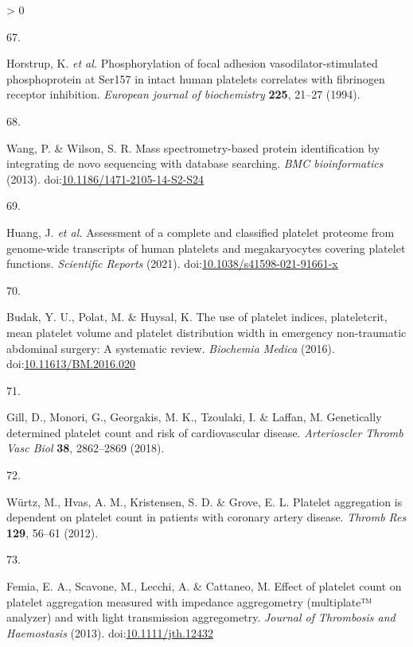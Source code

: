 \documentclass[11pt,twoside]{bristolthesis}
\newlength{\cslhangindent}
\newlength{\csllabelwidth}
\newenvironment{CSLReferences}[2] %
 {%
  \setlength{\parindent}{0pt}
  \ifodd #1 \everypar{\setlength{\hangindent}{\cslhangindent}}\ignorespaces\fi
  \ifnum #2 > 0
  \setlength{\parskip}{#2\baselineskip}
  \fi
 }%
 {}
\newcommand{\CSLLeftMargin}[1]{\parbox[t]{\csllabelwidth}{#1}}
\newcommand{\CSLRightInline}[1]{\parbox[t]{\linewidth - \csllabelwidth}{#1}\break}
\begin{document}
\begin{CSLReferences}{0}{0}
\leavevmode\hypertarget{ref-Horstrup1994}{}%
\CSLLeftMargin{67. }
\CSLRightInline{Horstrup, K. \emph{et al.} Phosphorylation of focal adhesion vasodilator-stimulated phosphoprotein at Ser157 in intact human platelets correlates with fibrinogen receptor inhibition. \emph{European journal of biochemistry} \textbf{225}, 21--27 (1994).}

\leavevmode\hypertarget{ref-Wang2013}{}%
\CSLLeftMargin{68. }
\CSLRightInline{Wang, P. \& Wilson, S. R. Mass spectrometry-based protein identification by integrating de novo sequencing with database searching. \emph{BMC bioinformatics} (2013). doi:\href{https://doi.org/10.1186/1471-2105-14-S2-S24}{10.1186/1471-2105-14-S2-S24}}

\leavevmode\hypertarget{ref-Huang2021}{}%
\CSLLeftMargin{69. }
\CSLRightInline{Huang, J. \emph{et al.} Assessment of a complete and classified platelet proteome from genome-wide transcripts of human platelets and megakaryocytes covering platelet functions. \emph{Scientific Reports} (2021). doi:\href{https://doi.org/10.1038/s41598-021-91661-x}{10.1038/s41598-021-91661-x}}

\leavevmode\hypertarget{ref-Budak2016}{}%
\CSLLeftMargin{70. }
\CSLRightInline{Budak, Y. U., Polat, M. \& Huysal, K. The use of platelet indices, plateletcrit, mean platelet volume and platelet distribution width in emergency non-traumatic abdominal surgery: A systematic review. \emph{Biochemia Medica} (2016). doi:\href{https://doi.org/10.11613/BM.2016.020}{10.11613/BM.2016.020}}

\leavevmode\hypertarget{ref-Gill2018}{}%
\CSLLeftMargin{71. }
\CSLRightInline{Gill, D., Monori, G., Georgakis, M. K., Tzoulaki, I. \& Laffan, M. Genetically determined platelet count and risk of cardiovascular disease. \emph{Arterioscler Thromb Vasc Biol} \textbf{38}, 2862--2869 (2018).}

\leavevmode\hypertarget{ref-Wurtz2012}{}%
\CSLLeftMargin{72. }
\CSLRightInline{Würtz, M., Hvas, A. M., Kristensen, S. D. \& Grove, E. L. Platelet aggregation is dependent on platelet count in patients with coronary artery disease. \emph{Thromb Res} \textbf{129}, 56--61 (2012).}

\leavevmode\hypertarget{ref-Femia2013}{}%
\CSLLeftMargin{73. }
\CSLRightInline{Femia, E. A., Scavone, M., Lecchi, A. \& Cattaneo, M. Effect of platelet count on platelet aggregation measured with impedance aggregometry (multiplate™ analyzer) and with light transmission aggregometry. \emph{Journal of Thrombosis and Haemostasis} (2013). doi:\href{https://doi.org/10.1111/jth.12432}{10.1111/jth.12432}}


\end{CSLReferences}
\end{document}
